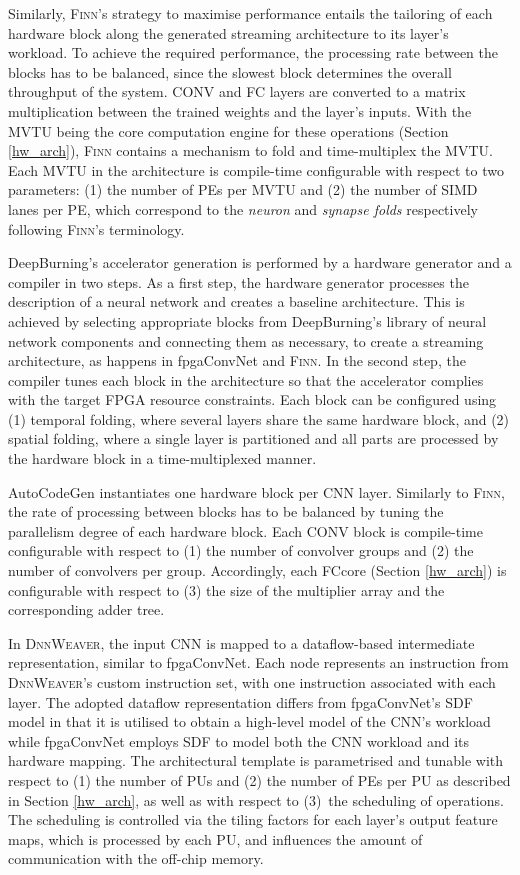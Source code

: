 \documentclass[format=acmsmall, review=false, screen=true]{acmart}
\begin{document}
Similarly, \textsc{Finn}'s strategy to maximise performance entails the tailoring of each hardware block along the generated streaming architecture to its layer's workload. To achieve the required performance, the processing rate between the blocks has to be balanced, since the slowest block determines the overall throughput of the system. 
CONV and FC layers are converted to a matrix multiplication between the trained weights and the layer's inputs. With the MVTU being the core computation engine for these operations (Section \ref{hw_arch}), \textsc{Finn} contains a mechanism to fold and time-multiplex the MVTU. Each MVTU in the architecture is compile-time configurable with respect to two parameters: (1) the number of PEs per MVTU and (2) the number of SIMD lanes per PE, which correspond to the \textit{neuron} and \textit{synapse folds} respectively following \textsc{Finn}'s terminology.


DeepBurning's accelerator generation is performed by a hardware generator and a compiler in two steps. As a first step, the hardware generator processes the description of a neural network and creates a baseline architecture. This is achieved by selecting appropriate blocks from DeepBurning's library of neural network components and connecting them as necessary, to create a streaming architecture, as happens in fpgaConvNet and \textsc{Finn}. In the second step, the compiler tunes each block in the architecture so that the accelerator complies with the target FPGA resource constraints. Each block can be configured using (1) temporal folding, where several layers share the same hardware block, and (2) spatial folding, where a single layer is partitioned and all parts are processed by the hardware block in a time-multiplexed manner.

{\color{black}AutoCodeGen instantiates one hardware block per CNN layer. Similarly to \textsc{Finn}, the rate of processing between blocks has to be balanced by tuning the parallelism degree of each hardware block. Each CONV block is compile-time configurable with respect to (1) the number of convolver groups and (2) the number of convolvers per group. Accordingly, each FCcore (Section \ref{hw_arch}) is configurable with respect to (3) the size of the multiplier array and the corresponding adder tree.}


In \textsc{DnnWeaver}, the input CNN is mapped to a dataflow-based intermediate representation, similar to fpgaConvNet. Each node represents an instruction from \textsc{DnnWeaver}'s custom instruction set, with one instruction associated with each layer. The adopted dataflow representation differs from fpgaConvNet's SDF model in that it is utilised to obtain a high-level model of the CNN's workload while fpgaConvNet employs SDF to model both the CNN workload and its hardware mapping. The architectural template is parametrised and tunable with respect to (1) the number of PUs and (2) the number of PEs per PU as described in Section \ref{hw_arch}, as well as with respect to \mbox{(3) the} scheduling of operations. The scheduling is controlled via the tiling factors for each layer's output feature maps, which is processed by each PU, and influences the amount of communication with the off-chip memory.
\end{document}
